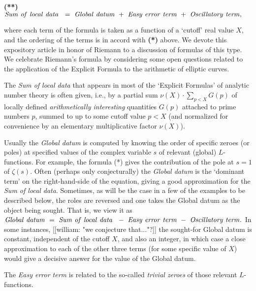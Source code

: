 \documentclass[11pt]{article}
\theoremstyle{plain}
\theoremstyle{definition}
\numberwithin{equation}{section}
\numberwithin{figure}{section}
\numberwithin{table}{section}
\begin{document}
 {{\bf (**)} \ \  ${\rm{\it Sum\ of\ local\ data\  }}  \ = \  {\rm{\it Global\ datum}}\ +\  {\rm{\it  Easy\ error\ term}}\ +\  {\rm{\it  Oscillatory\ term}},$ }


 \noindent where each  term of the formula  is taken as a function of a `cutoff' real value $X$, and the ordering of the terms is in accord with {\bf(*)} above. We devote this expository  article in honor of Riemann to a discussion of formulas of this type. We celebrate Riemann's formula  by considering some open questions related to the application of the Explicit Formula to the arithmetic of elliptic curves.

  The {\it Sum of local data} that appears in most of the `Explicit Formulas' of analytic number theory is often given, i.e., by a partial sum $\nu(X)\cdot\sum_{p<X}G(p)$ of locally defined {\it arithmetically interesting} quantities $G(p)$ attached to prime numbers $p$, summed to up to some cutoff
value $p<X$  (and normalized for convenience by an elementary multiplicative factor $\nu(X)$).

   Usually the {\it Global datum} is computed by knowing the order of specific zeroes (or poles) at specified values of the complex variable $s$  of relevant (global) $L$-functions.  For example, the formula {(*)} gives the contribution of the pole at $s=1$ of $\zeta(s)$.  Often (perhaps only conjecturally)  the  {\it Global datum} is the `dominant term'    on the right-hand-side of the equation, giving a good approximation for the {\it Sum of local data}. Sometimes, as will be the case in a few of the examples to be described below, the roles are reversed and one takes the Global datum as the object being sought.  That is, we view it as ${\rm{\it Global\ datum}}\ = \  {\rm{\it Sum\ of\ local\ data\  }}\ -\  {\rm{\it  Easy\ error\ term}}\ -\  {\rm{\it  Oscillatory\ term}}.$  In some instances, [[william: "we conjecture that..."?]] the sought-for Global datum is constant, independent of the cutoff $X$, and also an integer, in which case a close approximation to each of the other three terms (for some specific value of $X$) would give a decisive answer for the value of the Global datum.


 The {\it Easy error term}  is related to the so-called {\it trivial zeroes} of those relevant $L$-functions.
\end{document}
